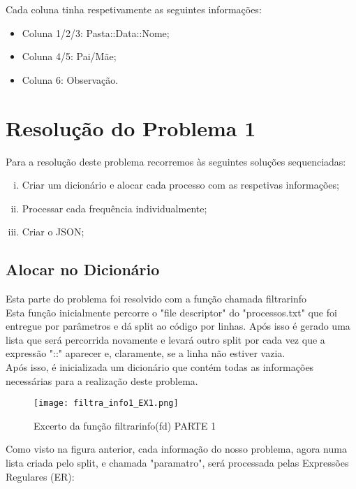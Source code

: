 \documentclass[11pt,a4paper]{report}%
\begin{document}
Cada coluna tinha respetivamente as seguintes informações:

\begin{itemize}
  \item Coluna 1/2/3: Pasta::Data::Nome;
  \item Coluna 4/5: Pai/Mãe;
  \item Coluna 6: Observação.
\end{itemize}


\section{Resolução do Problema 1} \label{sec:resProb1}

Para a resolução deste problema recorremos às seguintes soluções sequenciadas:

\begin{enumerate}[i)]
     \item Criar um dicionário e alocar cada processo com as respetivas informações;
     \item Processar cada frequência individualmente; 
     \item Criar o JSON;
  \end{enumerate}
  
  
  
\subsection{Alocar no Dicionário} \label{subsec:parser1}
Esta parte do problema foi resolvido com a função chamada filtrar\textunderscore info\\
Esta função inicialmente percorre o "file descriptor" do "processos.txt" que foi entregue por parâmetros e dá split ao código por linhas. Após isso é gerado uma lista que será percorrida novamente e levará outro split por cada vez que a expressão "::" aparecer e, claramente, se a linha não estiver vazia.\\
Após isso, é inicializada um dicionário que contém todas as informações necessárias para a realização deste problema.


\begin{figure}[htbp]
\centerline{\texttt{[image: filtra\_info1\_EX1.png]}}
\caption{Excerto da função filtrar\textunderscore info(fd) PARTE 1}
\label{fig}
\end{figure}  

Como visto na figura anterior, cada informação do nosso problema, agora numa lista criada pelo split, e chamada "paramatro", será processada pelas Expressões Regulares (ER):
\end{document}
